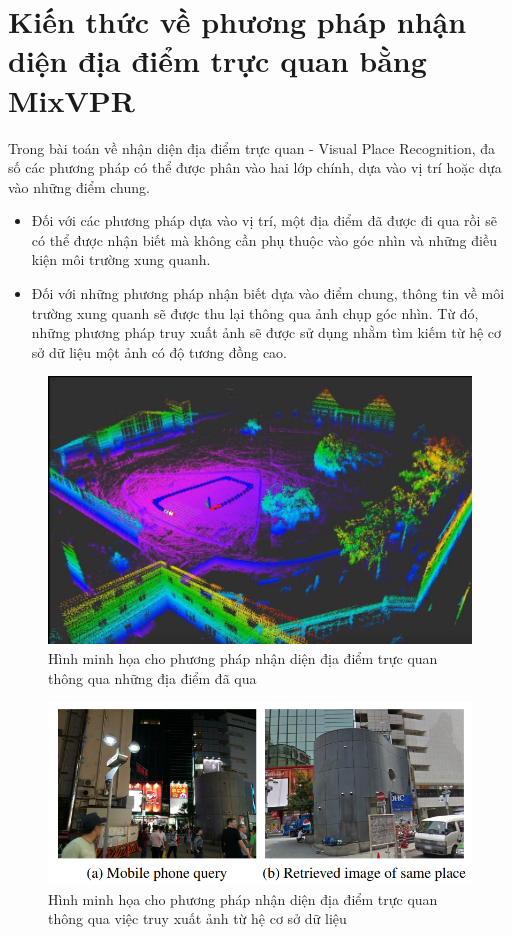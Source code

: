 \section{Kiến thức về phương pháp nhận diện địa điểm trực quan bằng MixVPR}
Trong bài toán về nhận diện địa điểm trực quan - Visual Place Recognition, đa số các phương pháp có thể được phân vào hai lớp chính, dựa vào vị trí hoặc dựa vào những điểm chung\cite{yin2022general}.
\begin{itemize}
    \item Đối với các phương pháp dựa vào vị trí, một địa điểm đã được đi qua rồi sẽ có thể được nhận biết mà không cần phụ thuộc vào góc nhìn và những điều kiện môi trường xung quanh.
    \item Đối với những phương pháp nhận biết dựa vào điểm chung, thông tin về môi trường xung quanh sẽ được thu lại thông qua ảnh chụp góc nhìn. Từ đó, những phương pháp truy xuất ảnh sẽ được sử dụng nhằm tìm kiếm từ hệ cơ sở dữ liệu một ảnh có độ tương đồng cao.
\end{itemize}
\begin{figure}[H]
    \centering
    \includegraphics[scale=0.4]{pics/Chapter3/position-based.png}
    \caption{Hình minh họa cho phương pháp nhận diện địa điểm trực quan thông qua những địa điểm đã qua \cite{slamposition}}
    \label{fig:enter-label}
\end{figure}
\begin{figure}[H]
    \centering
    \includegraphics[scale=0.7]{pics/Chapter3/overlap-based.png}
    \caption{Hình minh họa cho phương pháp nhận diện địa điểm trực quan thông qua việc truy xuất ảnh từ hệ cơ sở dữ liệu \cite{arandjelovic2016netvlad}}
    \label{fig:enter-label}
\end{figure}

